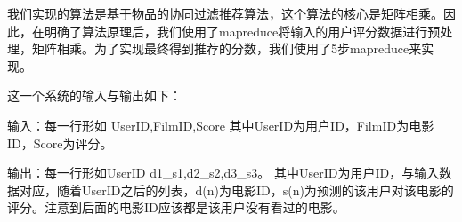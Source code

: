 \documentclass[forprint]{myreport}
\begin{document}
我们实现的算法是基于物品的协同过滤推荐算法，这个算法的核心是矩阵相乘。因此，在明确了算法原理后，我们使用了mapreduce将输入的用户评分数据进行预处理，矩阵相乘。为了实现最终得到推荐的分数，我们使用了5步mapreduce来实现。

这一个系统的输入与输出如下：

输入：每一行形如 UserID,FilmID,Score
其中UserID为用户ID，FilmID为电影ID，Score为评分。

输出：每一行形如UserID d1\_s1,d2\_s2,d3\_s3。
其中UserID为用户ID，与输入数据对应，随着UserID之后的列表，d(n)为电影ID，s(n)为预测的该用户对该电影的评分。注意到后面的电影ID应该都是该用户没有看过的电影。

\begin{multicols}{2} %
    \begin{figure}[htp]
      \centering

\end{figure}
\end{multicols}
\end{document}
